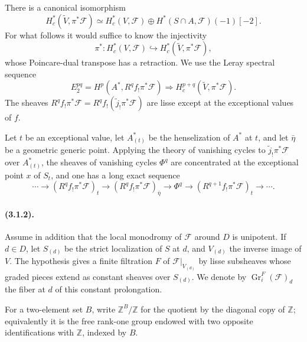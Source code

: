\documentclass[11pt]{article}
\theoremstyle{remark}
\begin{document}
There is a canonical isomorphism
\begin{equation}\tag{3.1.1.3}
H^*_c(\widetilde V,\pi^*\mathcal F)\simeq H^*_c(V,\mathcal F)\oplus H^*(S\cap A,\mathcal F)(-1)[-2].
\end{equation}
For what follows it would suffice to know the injectivity
\begin{equation}\tag{3.1.1.4}
\pi^*:H^*_c(V,\mathcal F)\hookrightarrow H^*_c(\widetilde V,\pi^*\mathcal F),
\end{equation}
whose Poincare-dual transpose has a retraction. We use the Leray spectral sequence
\begin{equation}\tag{3.1.1.5}
E_2^{pq}=H^p(A^*,R^qf_{!}\pi^*\mathcal F)\Rightarrow H^{p+q}_c(\widetilde V,\pi^*\mathcal F).
\end{equation}
The sheaves $R^qf_{!}\pi^*\mathcal F=R^qf_{!}(\tilde j_{!}\pi^*\mathcal F)$ are lisse except at the exceptional values of $f$.

Let $t$ be an exceptional value, let $A^*_{(t)}$ be the henselization of $A^*$ at $t$, and let $\bar\eta$ be a geometric generic point. Applying the theory of vanishing cycles to $\tilde j_{!}\pi^*\mathcal F$ over $A^*_{(t)}$, the sheaves of vanishing cycles $\Phi^q$ are concentrated at the exceptional point $x$ of $S_t$, and one has a long exact sequence
\begin{equation}\tag{3.1.1.6}
\cdots\to (R^qf_{!}\pi^*\mathcal F)_t\to (R^qf_{!}\pi^*\mathcal F)_{\bar\eta}\to \Phi^q\to (R^{q+1}f_{!}\pi^*\mathcal F)_t\to\cdots .
\end{equation}

\paragraph{(3.1.2).}
Assume in addition that the local monodromy of $\mathcal F$ around $D$ is unipotent. If $d\in D$, let $S_{(d)}$ be the strict localization of $S$ at $d$, and $V_{(d)}$ the inverse image of $V$. The hypothesis gives a finite filtration $F$ of $\mathcal F|_{V_{(d)}}$ by lisse subsheaves whose graded pieces extend as constant sheaves over $S_{(d)}$. We denote by $\operatorname{Gr}^F_i(\mathcal F)_d$ the fiber at $d$ of this constant prolongation.

For a two-element set $B$, write $\mathbb Z^B/\mathbb Z$ for the quotient by the diagonal copy of $\mathbb Z$; equivalently it is the free rank-one group endowed with two opposite identifications with $\mathbb Z$, indexed by $B$.
\end{document}
